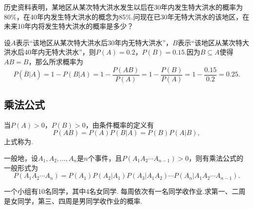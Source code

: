 \begin{example}
历史资料表明，某地区从某次特大洪水发生以后在30年内发生特大洪水的概率为80\%，在40年内发生特大洪水的概念为85\%.问现在已30年无特大洪水的该地区，在未来10年内将发生特大洪水的概率是多少？
\begin{solution}
设\(A\)表示“该地区从某次特大洪水后30年内无特大洪水”，\(B\)表示“该地区从某次特大洪水后40年内无特大洪水”，则\(P(A) = 0.2\)，\(P(B) = 0.15\).因为\(B \subseteq A\)使得\(AB = B\)，那么所求概率为\[
P(\overline{B} \vert A)
= 1 - P(B \vert A)
= 1 - \frac{P(AB)}{P(A)}
= 1 - \frac{P(B)}{P(A)}
= 1 - \frac{0.15}{0.2}
= 0.25.
\]
\end{solution}
\end{example}

\subsection{乘法公式}
\begin{theorem}[概率的乘法]
当\(P(A) > 0\)，\(P(B) > 0\)，由条件概率的定义有\begin{equation}
P(AB) = P(A) P(B \vert A) = P(B) P(A \vert B),
\end{equation}上式称为.

一般地，设\(A_1,A_2,\dotsc,A_n\)是\(n\)个事件，且\(P(A_1 A_2 \dotsm A_{n-1}) > 0\)，则有乘法公式的一般形式为\begin{equation}
P(A_1 A_2 \dotsm A_n)
= P(A_1) P(A_2 \vert A_1) P(A_3 \vert A_1 A_2) \dotsm P(A_n \vert A_1 A_2 \dotsm A_{n-1}).
\end{equation}
\end{theorem}

\begin{example}
一个小组有10名同学，其中4名女同学.
每周依次有一名同学收作业.求第一、二周是女同学，第三、四周是男同学收作业的概率.
\end{example}

